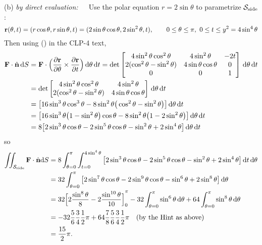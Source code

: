 \begin{solution}
(b) \emph{\it by direct evaluation:}\ \ \ 
Use the polar equation $r=2\sin\theta$ to parametrize $\mathcal{S}_{\rm side}$:
$$
\mathbf{r}(\theta,t)
= (r\cos\theta,r\sin\theta,t)
= (2\sin\theta\cos\theta, 2\sin^2\theta, t),
\qquad
0\le\theta\le\pi,\
0\le t\le y^2 = 4\sin^4\theta
$$
Then using () in the CLP-4 text,
\begin{align*}
\mathbf{F}\cdot \hat{\mathbf{n}}\,\mathrm{d}S
&= \mathbf{F}\cdot\Big(\frac{\partial\mathbf{r}}{\partial \theta}
         \times\frac{\partial\mathbf{r}}{\partial t}\Big)\,\mathrm{d}\theta\,\mathrm{d}t
= \det\left[\begin{matrix}
4\sin^2\theta\cos^2\theta    & 4\sin^2\theta         & -2t \\
2(\cos^2\theta-\sin^2\theta) & 4\sin\theta\cos\theta & 0 \\
0                            & 0                     & 1 \end{matrix}\right]
\,\mathrm{d}\theta\,\mathrm{d}t \\
&= \det\left[\begin{matrix}
4\sin^2\theta\cos^2\theta    & 4\sin^2\theta          \\
2(\cos^2\theta-\sin^2\theta) & 4\sin\theta\cos\theta \end{matrix}\right]
\,\mathrm{d}\theta\,\mathrm{d}t \\
&= \big[16\sin^3\theta\cos^3\theta - 8\sin^2\theta\big(\cos^2\theta-\sin^2\theta\big)\big]
\,\mathrm{d}\theta\,\mathrm{d}t
\\
&= \big[16\sin^3\theta\big(1-\sin^2\theta\big)\cos\theta - 8\sin^2\theta\big(1 - 2\sin^2\theta\big)\big]
\,\mathrm{d}\theta\,\mathrm{d}t
\\
&= 8\big[2\sin^3\theta\cos\theta - 2\sin^5\theta\cos\theta - \sin^2\theta + 2\sin^4\theta\big]
\,\mathrm{d}\theta\,\mathrm{d}t
\end{align*}
so
\begin{align*}
\iint_{\cal S_{\rm side}}\mathbf{F}\cdot \hat{\mathbf{n}}\mathrm{d}S
&= 8\int_{\theta=0}^\pi \int_{t=0}^{4\sin^4\theta}
\big[2\sin^3\theta\cos\theta - 2\sin^5\theta\cos\theta - \sin^2\theta + 2\sin^4\theta\big]
\,\mathrm{d}t\,\mathrm{d}\theta
\\
&= 32\int_{\theta=0}^\pi 
\big[2\sin^7\theta\cos\theta - 2\sin^9\theta\cos\theta - \sin^6\theta + 2\sin^8\theta\big]
\,\mathrm{d}\theta
\\
&=32{\Big[2\frac{\sin^8\theta}{8}-2\frac{\sin^{10}\theta}{10}\Big]}_0^\pi
-32\int_{\theta=0}^\pi \sin^6\theta \,\mathrm{d}\theta
+64\int_{\theta=0}^\pi \sin^8\theta \,\mathrm{d}\theta \\
&= -32 \frac{5}{6}\frac{3}{4}\frac{1}{2}\pi 
   + 64\frac{7}{8}\frac{5}{6}\frac{3}{4}\frac{1}{2}\pi
\quad\text{(by the Hint as above)}
\\
&= \frac{15}{2}\pi.
\end{align*}


\end{solution}
